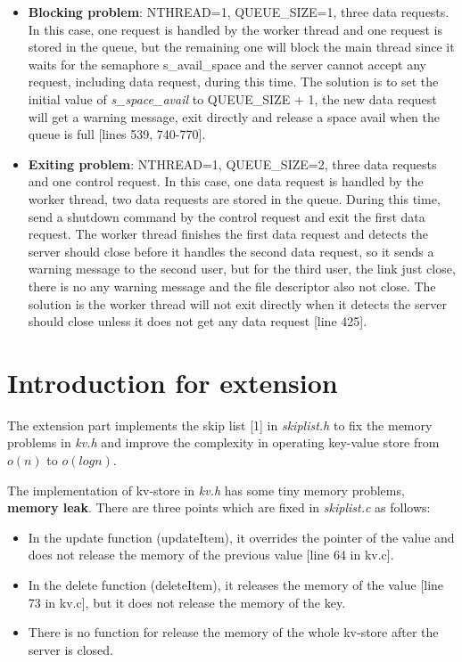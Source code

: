 \documentclass[10pt, a4paper]{article}
\begin{document}
\begin{itemize}
    \item \textbf{Blocking problem}: NTHREAD=1, QUEUE\_SIZE=1, three data requests. In this case, one request is handled by the worker thread and one request is stored in the queue, but the remaining one will block the main thread since it waits for the semaphore s\_avail\_space and the server cannot accept any request, including data request, during this time. The solution is to set the initial value of \textit{s\_space\_avail} to QUEUE\_SIZE + 1, the new data request will get a warning message, exit directly and release a space avail when the queue is full [lines 539, 740-770].
    
    \item \textbf{Exiting problem}: NTHREAD=1, QUEUE\_SIZE=2, three data requests and one control request. In this case, one data request is handled by the worker thread, two data requests are stored in the queue. During this time, send a shutdown command by the control request and exit the first data request. The worker thread finishes the first data request and detects the server should close before it handles the second data request, so it sends a warning message to the second user, but for the third user, the link just close, there is no any warning message and the file descriptor also not close. The solution is the worker thread will not exit directly when it detects the server should close unless it does not get any data request [line 425].
    
\end{itemize}


\section{Introduction for extension}

The extension part implements the skip list [1] in \textit{skiplist.h} to fix the memory problems in \textit{kv.h} and improve the complexity in operating key-value store from $o(n)$ to $o(logn)$.

The implementation of kv-store in \textit{kv.h} has some tiny memory problems, \textbf{memory leak}. There are three points which are fixed in \textit{skiplist.c} as follows:

\begin{itemize}
    \item In the update function (updateItem), it overrides the pointer of the value and does not release the memory of the previous value [line 64 in kv.c].
    \item In the delete function (deleteItem), it releases the memory of the value [line 73 in kv.c], but it does not release the memory of the key.
    \item There is no function for release the memory of the whole kv-store after the server is closed.
\end{itemize}
\end{document}

